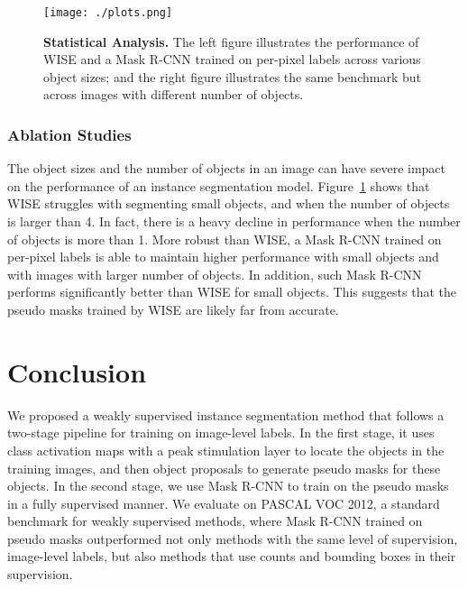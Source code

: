 \documentclass{bmvc2k}
\begin{document}
\begin{figure}[t]
    \centering
    \texttt{[image: ./plots.png]}
    \vspace{-3mm}
    \caption{\textbf{Statistical Analysis.} The left figure illustrates the performance of WISE and a Mask R-CNN trained on per-pixel labels across various object sizes; and the right figure illustrates the same benchmark but across images with different number of objects.}
    \label{fig:plots}
\end{figure}

\subsubsection{Ablation Studies}
The object sizes and the number of objects in an image can have severe impact on the performance of an instance segmentation model. Figure~\ref{fig:plots} shows that WISE struggles with segmenting small objects, and when the number of objects is larger than 4. In fact, there is a heavy decline in performance when the number of objects is more than 1. More robust than WISE, a Mask R-CNN trained on per-pixel labels is able to maintain higher performance with small objects and with images with larger number of objects. In addition, such Mask R-CNN performs significantly better than WISE for small objects. This suggests that the pseudo masks trained by WISE are likely far from accurate.















\section{Conclusion}
We proposed a weakly supervised instance segmentation method that follows a two-stage pipeline for training on image-level labels. In the first stage, it uses class activation maps with a peak stimulation layer to locate the objects in the training images, and then object proposals to generate pseudo masks for these objects. In the second stage, we use Mask R-CNN to train on the pseudo masks in a fully supervised manner. We evaluate on PASCAL VOC 2012, a standard benchmark for weakly supervised methods, where Mask R-CNN trained on pseudo masks outperformed not only methods with the same level of supervision, image-level labels, but also methods that use counts and bounding boxes in their supervision.

\end{document}
